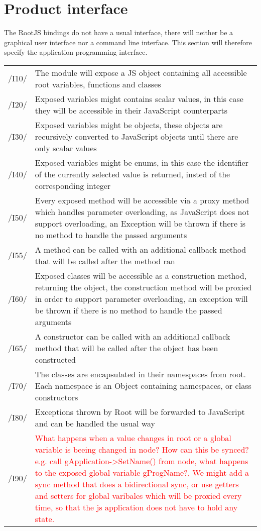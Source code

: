 \chapter{Product interface}
The RootJS bindings do not have a usual interface, there will neither be a graphical user interface nor a command line interface.
This section will therefore specify the application programming interface.


\begin{longtable}{|p{1cm} | p{10cm}|}
   \hline
  /I10/ & The module will expose a JS object containing all accessible root variables, functions and classes \\
  /I20/ & Exposed variables might contains scalar values, in this case they will be accessible in their JavaScript counterparts \\
  /I30/ & Exposed variables might be objects, these objects are recursively converted to JavaScript objects until there are only scalar values \\
  /I40/ & Exposed variables might be enums, in this case the identifier of the currently selected value is returned, insted of the corresponding integer \\
  /I50/ & Every exposed method will be accessible via a proxy method which handles parameter overloading, as JavaScript does not support overloading, an Exception will be thrown if there is no method to handle the passed arguments \\
  /I55/ & A method can be called with an additional callback method that will be called after the method ran \\
  /I60/ & Exposed classes will be accessible as a construction method, returning the object, the construction method will be proxied in order to support parameter overloading, an exception will be thrown if there is no method to handle the passed arguments \\
  /I65/ & A constructor can be called with an additional callback method that will be called after the object has been constructed \\
  /I70/ & The classes are encapsulated in their namespaces from root. Each namespace is an Object containing namespaces, or class constructors \\
  /I80/ & Exceptions thrown by Root will be forwarded to JavaScript and can be handled the usual way \\
  /I90/ & \textcolor{red}{What happens when a value changes in root or a global variable is beeing changed in node? How can this be synced? e.g. call gApplication->SetName() from node, what happens to the exposed global variable gProgName?, We might add a sync method that does a bidirectional sync, or use getters and setters for global varibales which will be proxied every time, so that the js application does not have to hold any state.} \\
   \hline
\end{longtable}
